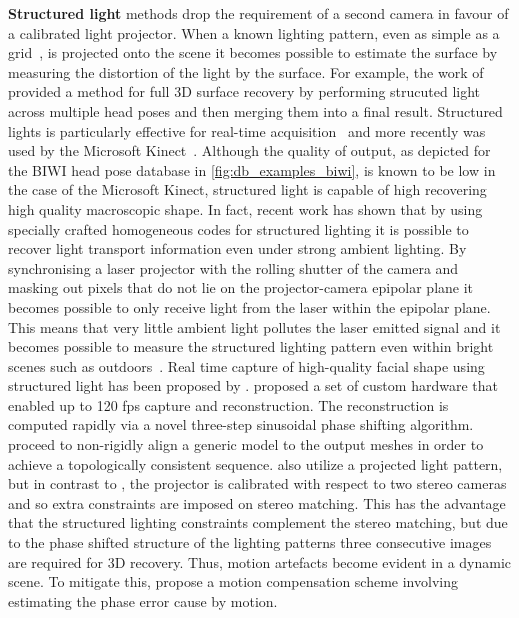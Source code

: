 \textbf{Structured light} methods drop the requirement of a second camera in
favour of a calibrated light projector. When a known lighting pattern, even as
simple as a grid~\cite{will1971grid}, is projected onto the scene it becomes
possible to estimate the surface by measuring the distortion of the light by the
surface. For example, the work of \citet{garcia2001low} provided a method
for full 3D surface recovery by performing strucuted light across multiple
head poses and then merging them into a final result.
Structured lights is particularly effective for real-time
acquisition~\cite{rusinkiewicz2002real} and more recently was used by the
Microsoft Kinect~\cite{zhang2012microsoft}. Although the quality of output, as
depicted for the BIWI head pose database in
\cref{fig:db_examples_biwi}, is known to be low in the case of the Microsoft
Kinect, structured light is capable of high recovering high quality macroscopic
shape. In fact, recent work has shown that by using specially crafted
homogeneous codes for structured lighting it is possible to recover light
transport information even under strong ambient lighting.
By synchronising a laser projector with the rolling shutter of the camera and
masking out pixels that do not lie on the projector-camera epipolar plane it
becomes possible to only receive light from the laser within the epipolar plane.
This means that very little ambient light pollutes the laser emitted
signal and it becomes possible to measure the structured lighting pattern
even within bright scenes such as outdoors~\cite{o2015homogeneous}.
Real time capture of high-quality facial shape using
structured light has been proposed by \citet{zhang2006high,weise2007fast}.
\citet{zhang2006high,wang2004high} proposed a set of custom hardware that
enabled up to 120 fps capture and reconstruction. The reconstruction is computed
rapidly via a novel three-step sinusoidal phase shifting algorithm.
\citet{zhang2006high} proceed to non-rigidly align a generic model to the output
meshes in order to achieve a topologically consistent sequence.
\citet{weise2007fast} also utilize a projected light pattern, but in contrast to
\citet{zhang2006high}, the projector is calibrated with respect to two stereo
cameras and so extra constraints are imposed on stereo matching. This has the
advantage that the structured lighting constraints complement the stereo
matching, but due to the phase shifted structure of the lighting patterns three
consecutive images are required for 3D recovery. Thus, motion artefacts become
evident in a dynamic scene. To mitigate this, \citet{weise2007fast} propose a
motion compensation scheme involving estimating the phase error cause by motion.

